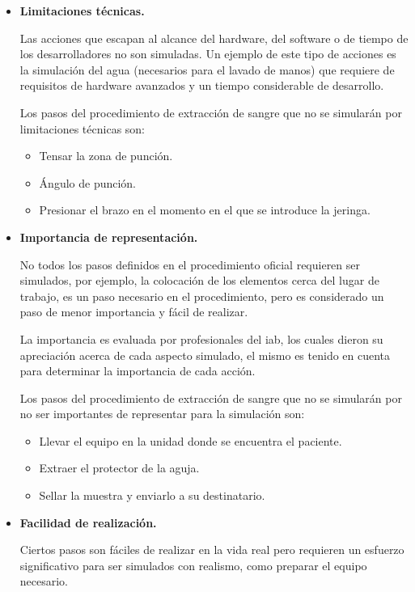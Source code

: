 \begin{itemize}
\item  \textbf{Limitaciones técnicas.} 
    
    Las acciones que escapan al alcance del hardware, del software o
    de tiempo de los desarrolladores no son simuladas. Un ejemplo de este 
    tipo de acciones es la simulación del agua (necesarios para el lavado de manos) 
    que requiere de requisitos de hardware avanzados y un tiempo considerable de
    desarrollo.
        
    Los pasos del procedimiento de extracción de sangre que no se simularán por 
    limitaciones técnicas son:
    \begin{itemize}
        \item Tensar la zona de punción.
        \item Ángulo de punción.
        \item Presionar el brazo en el momento en el que se introduce la jeringa.
    \end{itemize}
    
    
\item \textbf{Importancia de representación.}

    No todos los pasos definidos en el procedimiento        
    oficial requieren ser simulados, por ejemplo, la
    colocación de los elementos cerca del lugar de trabajo, es un paso necesario
    en el procedimiento, pero es considerado un paso de menor importancia y fácil de
    realizar.

    La importancia es evaluada por profesionales del \Gls{iab}, los
    cuales dieron su apreciación acerca de cada aspecto simulado, el mismo
    es tenido en cuenta para determinar la importancia de cada
    acción.
    
    Los pasos del procedimiento de extracción de sangre que no se simularán por 
    no ser importantes de representar para la simulación son:
    \begin{itemize}
        \item Llevar el equipo en la unidad donde se encuentra el paciente.
        \item Extraer el protector de la aguja.
        \item Sellar la muestra y enviarlo a su destinatario.
    \end{itemize}
    
    
\item \textbf{Facilidad de realización.}

    Ciertos pasos son fáciles de realizar en la vida real pero requieren un
    esfuerzo significativo para ser simulados con realismo, como preparar el
    equipo necesario.


\end{itemize}
